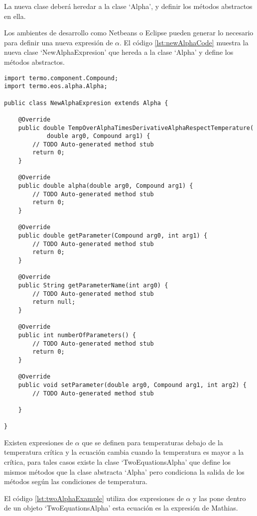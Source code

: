 	La nueva clase deberá heredar a la clase `Alpha', y definir los métodos abstractos en ella. 

	Los ambientes de desarrollo como Netbeans o Eclipse pueden generar lo necesario para definir una nueva expresión de $\alpha$. El código \ref{lst:newAlphaCode} muestra la nueva clase `NewAlphaExpresion' que hereda a la clase `Alpha' y define los métodos abstractos.


	\begin{lstlisting}[caption={Esqueleto para la creación de una nueva expresión de $\alpha$ para la librería materia, generado con el ambiente de desarrollo Eclipse},label={lst:newAlphaCode}]
import termo.component.Compound;
import termo.eos.alpha.Alpha;

public class NewAlphaExpresion extends Alpha {

	@Override
	public double TempOverAlphaTimesDerivativeAlphaRespectTemperature(
			double arg0, Compound arg1) {
		// TODO Auto-generated method stub
		return 0;
	}

	@Override
	public double alpha(double arg0, Compound arg1) {
		// TODO Auto-generated method stub
		return 0;
	}

	@Override
	public double getParameter(Compound arg0, int arg1) {
		// TODO Auto-generated method stub
		return 0;
	}

	@Override
	public String getParameterName(int arg0) {
		// TODO Auto-generated method stub
		return null;
	}

	@Override
	public int numberOfParameters() {
		// TODO Auto-generated method stub
		return 0;
	}

	@Override
	public void setParameter(double arg0, Compound arg1, int arg2) {
		// TODO Auto-generated method stub

	}

}

	\end{lstlisting}

	Existen expresiones de $\alpha$ que se definen para temperaturas debajo de la temperatura crítica y la ecuación cambia cuando la temperatura es mayor a la crítica, para tales casos existe la clase `TwoEquationsAlpha' que define los mismos métodos que la clase abstracta `Alpha' pero condiciona la salida de los métodos según las condiciones de temperatura. 

	El código \ref{lst:twoAlphaExample} utiliza dos expresiones de $\alpha$ y las pone dentro de un objeto `TwoEquationsAlpha' esta ecuación es la expresión de Mathias.

